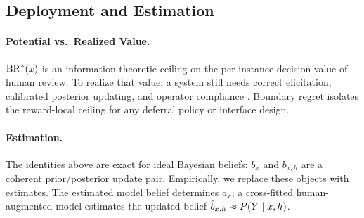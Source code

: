 %

\subsection{Deployment and Estimation}
\paragraph{Potential vs.\ Realized Value.}
$\operatorname{BR}^{*}(x)$ is an information-theoretic ceiling on the per-instance decision value of human review.
To realize that value, a system still needs correct elicitation, calibrated posterior updating, and operator compliance \citep{Vaccaro2024,BucinaEtAl2021}.
Boundary regret isolates the reward-local ceiling for any deferral policy or interface design.

\paragraph{Estimation.}\label{par:estimation}
The identities above are exact for ideal Bayesian beliefs: $b_x$ and $b_{x,h}$ are a coherent prior/posterior update pair.
Empirically, we replace these objects with estimates.
The estimated model belief determines $a_x$; a cross-fitted human-augmented model estimates the updated belief $\hat{b}_{x,h} \approx P(Y \mid x,h)$.


